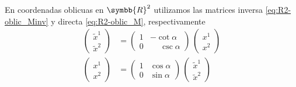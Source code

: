 En coordenadas oblicuas en $\symbb{R}^2$ utilizamos las matrices inversa
\eqref{eq:R2-oblic_Minv} y directa \eqref{eq:R2-oblic_M}, respectivamente
\begin{subequations}
  \begin{align}
    \begin{pmatrix}
      \tilde{x}^1\\
      \tilde{x}^2
    \end{pmatrix}
    &=
      \begin{pmatrix}
        1 & -\cot\alpha\\
        0 & \phantom{-}\csc\alpha
      \end{pmatrix}
      \,
    \begin{pmatrix}
      x^1\\
      x^2
    \end{pmatrix}\\
    \begin{pmatrix}
      x^1\\
      x^2
    \end{pmatrix}
    &=
      \begin{pmatrix}
        1 & \cos\alpha\\
        0 & \sin\alpha
      \end{pmatrix}
      \,
    \begin{pmatrix}
      \tilde{x}^1\\
      \tilde{x}^2
    \end{pmatrix}
  \end{align}
\end{subequations}


